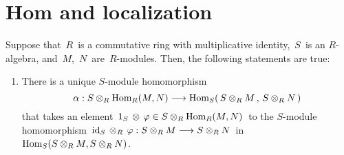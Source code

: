 

\section{Hom and localization}
\setcounter{theorem}{0}
\setcounter{equation}{0}


\renewcommand{\theenumi}{\roman{enumi}}
\renewcommand{\labelenumi}{\textnormal{(\theenumi)}$\;\;$}


\begin{proposition}
\label{HomAndLocalization}
\mbox{}
\vskip 0.1cm
\noindent
Suppose that \,$R$\, is a commutative ring with multiplicative identity, \,$S$\, is an $R$-algebra, and \,$M$,\, $N$\, are \,$R$-modules.
Then, the following statements are true:
\begin{enumerate}
\item
	There is a unique $S$-module homomorphism
	\begin{equation*}
	\alpha : S \otimes_{R} \textnormal{Hom}_{R}(M,N) \longrightarrow \textnormal{Hom}_{S}\!\left(\,S\otimes_{R}M\,,\,S\otimes_{R}N\,\right)
	\end{equation*}
	that takes an element
	\,$1_{S}\,\otimes\,\varphi \in S \otimes_{R} \textnormal{Hom}_{R}(M, N)$\,
	to the $S$-module homomorphism
	\,$\textnormal{id}_{S} \,\otimes_{R}\, \varphi : S \otimes_{R} M \longrightarrow S \otimes_{R} N$\,
	in
	\,$\textnormal{Hom}_{S}(S \otimes_{R} M, S \otimes_{R} N)$.

\end{enumerate}
\end{proposition}
